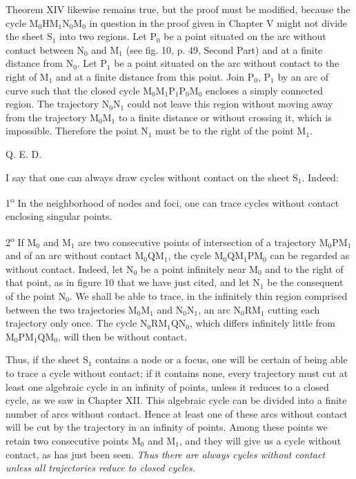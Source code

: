 \documentclass[11pt]{article}
\begin{document}
Theorem XIV likewise remains true, but the proof must be modified, because the cycle $\mathrm{M}_0\mathrm{H}\mathrm{M}_1\mathrm{N}_0\mathrm{M}_0$ in question in the proof given in Chapter V might not divide the sheet $\mathrm{S}_1$ into two regions. Let $\mathrm{P}_0$ be a point situated on the arc without contact between $\mathrm{N}_0$ and $\mathrm{M}_1$ (see fig. 10, p. 49, Second Part) and at a finite distance from $\mathrm{N}_0$. Let $\mathrm{P}_1$ be a point situated on the arc without contact to the right of $\mathrm{M}_1$ and at a finite distance from this point. Join $\mathrm{P}_0$, $\mathrm{P}_1$ by an arc of curve such that the closed cycle $\mathrm{M}_0\mathrm{M}_1\mathrm{P}_1\mathrm{P}_0\mathrm{M}_0$ encloses a simply connected region. The trajectory $\mathrm{N}_0\mathrm{N}_1$ could not leave this region without moving away from the trajectory $\mathrm{M}_0\mathrm{M}_1$ to a finite distance or without crossing it, which is impossible. Therefore the point $\mathrm{N}_1$ must be to the right of the point $\mathrm{M}_1$.
\begin{flushright}Q. E. D.\end{flushright}

I say that one can always draw cycles without contact on the sheet $\mathrm{S}_1$. Indeed:

1\textsuperscript{o} In the neighborhood of nodes and foci, one can trace cycles without contact enclosing singular points.

2\textsuperscript{o} If $\mathrm{M}_0$ and $\mathrm{M}_1$ are two consecutive points of intersection of a trajectory $\mathrm{M}_0\mathrm{P}\mathrm{M}_1$ and of an arc without contact $\mathrm{M}_0\mathrm{Q}\mathrm{M}_1$, the cycle $\mathrm{M}_0\mathrm{Q}\mathrm{M}_1\mathrm{P}\mathrm{M}_0$ can be regarded as without contact. Indeed, let $\mathrm{N}_0$ be a point infinitely near $\mathrm{M}_0$ and to the right of that point, as in figure 10 that we have just cited, and let $\mathrm{N}_1$ be the consequent of the point $\mathrm{N}_0$. We shall be able to trace, in the infinitely thin region comprised between the two trajectories $\mathrm{M}_0\mathrm{M}_1$ and $\mathrm{N}_0\mathrm{N}_1$, an arc $\mathrm{N}_0\mathrm{R}\mathrm{M}_1$ cutting each trajectory only once. The cycle $\mathrm{N}_0\mathrm{R}\mathrm{M}_1\mathrm{Q}\mathrm{N}_0$, which differs infinitely little from $\mathrm{M}_0\mathrm{P}\mathrm{M}_1\mathrm{Q}\mathrm{M}_0$, will then be without contact.

Thus, if the sheet $\mathrm{S}_1$ contains a node or a focus, one will be certain of being able to trace a cycle without contact; if it contains none, every trajectory must cut at least one algebraic cycle in an infinity of points, unless it reduces to a closed cycle, as we saw in Chapter XII. This algebraic cycle can be divided into a finite number of arcs without contact. Hence at least one of these arcs without contact will be cut by the trajectory in an infinity of points. Among these points we retain two consecutive points $\mathrm{M}_0$ and $\mathrm{M}_1$, and they will give us a cycle without contact, as has just been seen. \emph{Thus there are always cycles without contact unless all trajectories reduce to closed cycles.}
\end{document}
